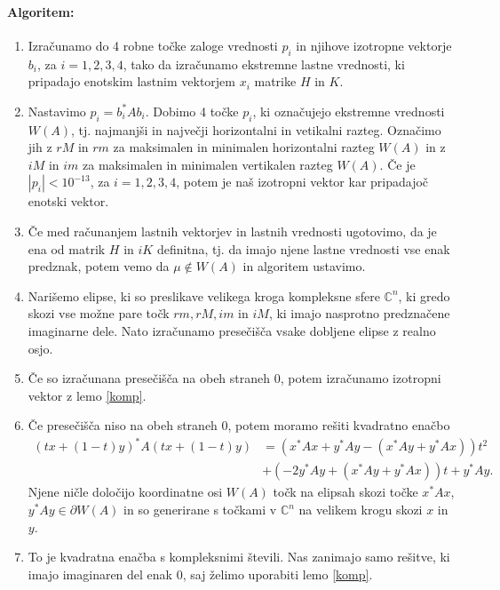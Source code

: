 \documentclass[12pt,a4paper]{amsart}
\theoremstyle{definition}
\theoremstyle{plain}
\newcommand{\C}{\mathbb C}
\begin{document}
\paragraph{Algoritem:}
\begin{enumerate}[1.]
\item Izračunamo do 4 robne točke zaloge vrednosti $p_i$ in njihove izotropne vektorje $b_i$, za $i=1,2,3,4$, tako da izračunamo ekstremne lastne vrednosti, ki pripadajo enotskim lastnim vektorjem $x_i$ %
matrike $H$ in $K$.
\item Nastavimo $p_i =b^\ast _i Ab_i$. Dobimo 4 točke $p_i$, ki označujejo ekstremne vrednosti $W(A)$, tj. najmanjši in največji horizontalni in vetikalni razteg. Označimo jih z $rM$ in $rm$ za maksimalen in minimalen horizontalni razteg $W(A)$ in z $iM$ in $im$ za maksimalen in minimalen vertikalen razteg $W(A)$.  Če je $|p_i|<10^{-13}$,  za $i=1,2,3,4$, potem je naš izotropni vektor kar pripadajoč enotski vektor.
\item Če med računanjem lastnih vektorjev in lastnih vrednosti ugotovimo, da je ena od matrik $H$ in $iK$ definitna, tj. da imajo njene lastne vrednosti vse enak predznak, potem vemo da $\mu \not\in W(A)$ in algoritem ustavimo.
\item Narišemo elipse, ki so preslikave velikega kroga kompleksne sfere $\C^n$, ki gredo skozi vse možne pare točk $rm, rM, im$ in $iM$, ki imajo nasprotno predznačene imaginarne dele. Nato izračunamo presečišča vsake dobljene elipse z realno osjo.%
\item Če so izračunana presečišča na obeh straneh 0, potem izračunamo izotropni vektor z lemo \ref{komp}.
\item Če presečišča niso na obeh straneh 0, potem moramo rešiti kvadratno enačbo 
\begin{align}\label{eq:en3}
(tx +(1-t)y)^\ast A(tx+(1-t)y) & =(x^\ast Ax+y^\ast Ay -(x^\ast Ay +y^\ast Ax))t^2 \\
&+(-2y^\ast Ay +(x^\ast Ay+y^\ast Ax))t +y^\ast Ay.\nonumber
\end{align}
Njene ničle določijo koordinatne osi $W(A)$ točk na elipsah skozi točke $x^\ast Ax$, $y^\ast Ay\in \partial W(A)$ %
in so generirane s točkami v $\C^n$ na velikem krogu skozi $x$ in $y$. 
\item To je kvadratna enačba s kompleksnimi števili. Nas zanimajo samo rešitve, ki imajo imaginaren del enak 0, saj želimo uporabiti lemo \ref{komp}.

\end{enumerate}
\end{document}
